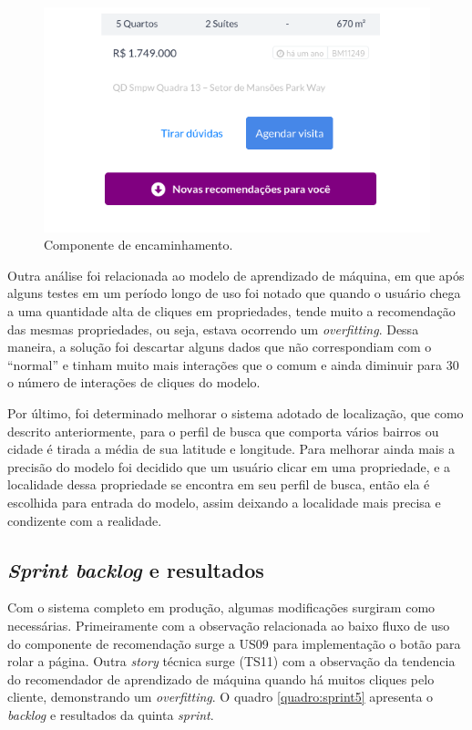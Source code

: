 \begin{figure}[H]
    \centering
    \includegraphics[scale=0.6]{figuras/desenvolvimento/componente_scroll.png}
    \caption[Componente de encaminhamento]{Componente de encaminhamento.}
    \label{fig:componente_scroll}
\end{figure}

Outra análise foi relacionada ao modelo de aprendizado de máquina, em que após alguns testes em um período longo de uso foi notado que quando o usuário chega a uma quantidade alta de cliques em propriedades, tende muito a recomendação das mesmas propriedades, ou seja, estava ocorrendo um \textit{overfitting}. Dessa maneira, a solução foi descartar alguns dados que não correspondiam com o “normal'' e tinham muito mais interações  que o comum e ainda diminuir para 30 o número de interações de cliques do modelo.

Por último, foi determinado melhorar o sistema adotado de localização, que como descrito anteriormente, para o perfil de busca que comporta vários bairros ou cidade é tirada a média de sua latitude e longitude. Para melhorar ainda mais a precisão do modelo foi decidido que um usuário clicar em uma propriedade, e a localidade dessa propriedade se encontra em seu perfil de busca, então ela é escolhida para entrada do modelo, assim deixando a localidade mais precisa e condizente com a realidade.

\subsection{\textit{Sprint backlog} e resultados}

Com o sistema completo em produção, algumas modificações surgiram como necessárias. Primeiramente com a observação relacionada ao baixo fluxo de uso do componente de recomendação surge a US09 para implementação o botão para rolar a página. Outra \textit{story} técnica surge (TS11) com a observação da tendencia do recomendador de aprendizado de máquina quando há muitos cliques pelo cliente, demonstrando um  \textit{overfitting}. O quadro \ref{quadro:sprint5} apresenta o \textit{backlog} e resultados da quinta  \textit{sprint}.

